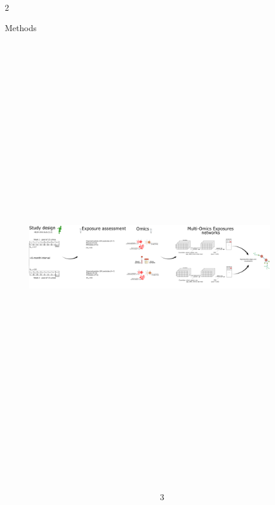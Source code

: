 \documentclass[final]{beamer}
\newlength{\sepwidth}
\newlength{\colwidth}
\newcommand{\separatorcolumn}{\begin{column}{\sepwidth}\end{column}}
\begin{document}
\begin{frame}[t]
\begin{columns}[t]
\begin{column}{2\colwidth}
  \begin{block}{Methods}
  \begin{figure}
		\centering
		\includegraphics[height=19cm,width=75cm]{images/methods.pdf}
	\end{figure}
  \end{block}

\end{column}

\separatorcolumn
\end{columns}


\begin{columns}[t]
\separatorcolumn

\begin{column}{3\colwidth}


\end{column}
\end{columns}
\end{frame}
\end{document}
